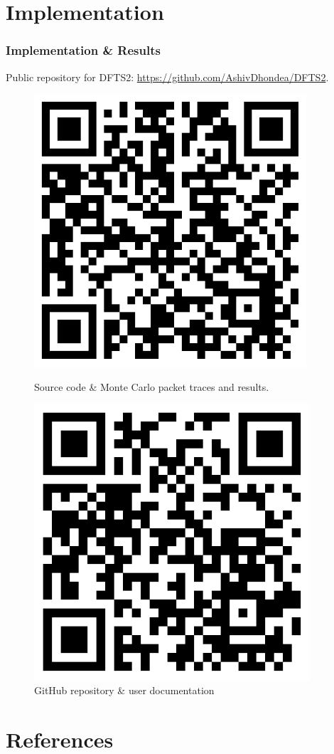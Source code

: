 \documentclass[aspectratio=169]{beamer}
\begin{document}
\section{Implementation}
\begin{frame}
\frametitle{Implementation \& Results}
Public repository for DFTS2: \url{https://github.com/AshivDhondea/DFTS2}.
	\begin{figure}
		\begin{minipage}{.4\textwidth}
			\includegraphics[width=0.8\linewidth]{qrcode_dpbx.pdf}
			\caption{Source code \& Monte Carlo packet traces and results.}
		\end{minipage}\hfill
		\begin{minipage}{.4\textwidth}
			\includegraphics[width=0.8\linewidth]{qrcode_github.pdf}
			\caption{GitHub repository \& user documentation}
		\end{minipage}
	\end{figure}
	\end{frame}
	
\section{References}


\end{document}
